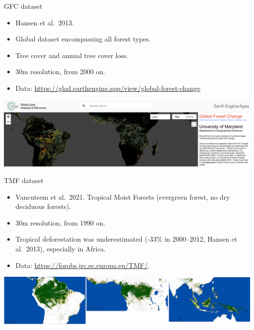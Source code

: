 \documentclass[10pt,table,dvipsnames,compress]{beamer}
\begin{document}
\begin{frame}[label={sec:org67ec52b}]{GFC dataset}
\begin{itemize}
\item Hansen et al. 2013.
\item Global dataset encompassing all forest types.
\item Tree cover and annual tree cover loss.
\item 30m resolution, from 2000 on.
\item Data: \url{https://glad.earthengine.app/view/global-forest-change}
\end{itemize}

\begin{center}
\includegraphics[width=\textwidth]{figs/gfc.png}
\end{center}
\end{frame}

\begin{frame}[label={sec:org3cd736c}]{TMF dataset}
\begin{itemize}
\item Vancutsem et al. 2021.
Tropical Moist Forests (evergreen forest, no dry deciduous forests).
\item 30m resolution, from 1990 on.
\item Tropical deforestation was underestimated (-33\% in 2000--2012, Hansen
et al. 2013), especially in Africa.
\item Data: \url{https://forobs.jrc.ec.europa.eu/TMF/}.
\end{itemize}

\vspace{0.25cm}

\begin{center}
\includegraphics[width=\textwidth]{figs/Vancutsem2021-maps-wide.png}
\end{center}
\end{frame}
\end{document}
